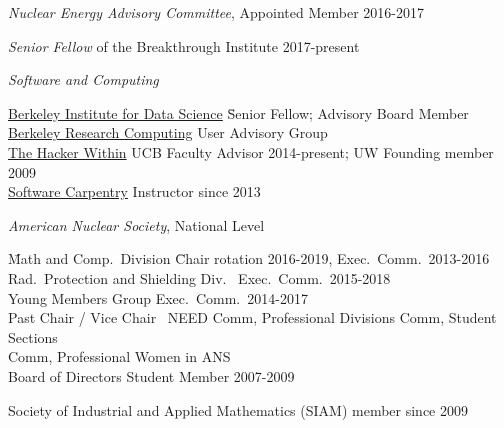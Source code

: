 \vspace*{-.25em}
\textit{Nuclear Energy Advisory Committee}, Appointed Member 2016-2017

\vspace*{-.5em}
\textit{Senior Fellow} of the Breakthrough Institute 2017-present

\vspace*{-.5em}
\textit{Software and Computing}
\vspace*{-.5em}
\begin{tabbing}
\hspace*{2 em}\=\href{http://bids.berkeley.edu/}{Berkeley Institute for Data Science} \= Senior Fellow; Advisory Board Member\\
%
\>\href{http://research-it.berkeley.edu/programs/berkeley-research-computing}{Berkeley Research Computing} \> User Advisory Group\\
%
%
\> \href{http://thehackerwithin.github.io/berkeley/}{The Hacker Within}  \> UCB Faculty Advisor 2014-present; UW Founding member 2009\\
%
\> \href{http://software-carpentry.org/}{Software Carpentry}  \> Instructor since 2013%
%
\end{tabbing}
%
\vspace*{-.5em}
\textit{American Nuclear Society}, National Level
\vspace*{-.5em}
\begin{tabbing}
\hspace*{2 em}\= Math and Comp.\ Division \hspace*{6em} \= Chair rotation 2016-2019, Exec.\ Comm.\ 2013-2016 \\
%
\> Rad.\ Protection and Shielding Div.\ \> Exec.\ Comm.\ 2015-2018\\
%
\> Young Members Group \> Exec.\ Comm.\ 2014-2017\\
%
\> Past Chair / Vice Chair\ \> NEED Comm, Professional Divisions Comm, Student Sections\\ \> \> Comm, Professional Women in ANS\ \\
%
%
%
%
\> Board of Directors \>	Student Member 2007-2009
%
\end{tabbing}

\vspace*{-.5em}
Society of Industrial and Applied Mathematics (SIAM) member since 2009 

